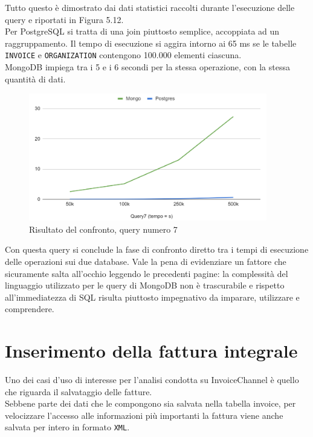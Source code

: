 \noindent Tutto questo è dimostrato dai dati statistici raccolti durante l'esecuzione delle query e riportati in Figura 5.12.\\
Per PostgreSQL si tratta di una join piuttosto semplice, accoppiata ad un raggruppamento. Il tempo di esecuzione si aggira intorno ai 65 ms se le tabelle \texttt{INVOICE} e \texttt{ORGANIZATION} contengono 100.000 elementi ciascuna.\\
MongoDB impiega tra i 5 e i 6 secondi per la stessa operazione, con la stessa quantità di dati.

\begin{figure}[htbp]
\begin{center}
\includegraphics[height=15em]{immagini/query/query7_results.png}
\caption{Risultato del confronto, query numero 7}
\end{center}
\end{figure}

\noindent Con questa query si conclude la fase di confronto diretto tra i tempi di esecuzione delle operazioni sui due database. Vale la pena di evidenziare un fattore che sicuramente salta all'occhio leggendo le precedenti pagine: la complessità del linguaggio utilizzato per le query di MongoDB non è trascurabile e rispetto all'immediatezza di \gls{SQL} risulta piuttosto impegnativo da imparare, utilizzare e comprendere.

\section{Inserimento della fattura integrale}
\label{sec:fattura-integrale}
Uno dei casi d'uso di interesse per l'analisi condotta su InvoiceChannel è quello che riguarda il salvataggio delle fatture.\\
Sebbene parte dei dati che le compongono sia salvata nella tabella invoice, per velocizzare l'accesso alle informazioni più importanti la fattura viene anche salvata per intero in formato \texttt{XML}.\\

